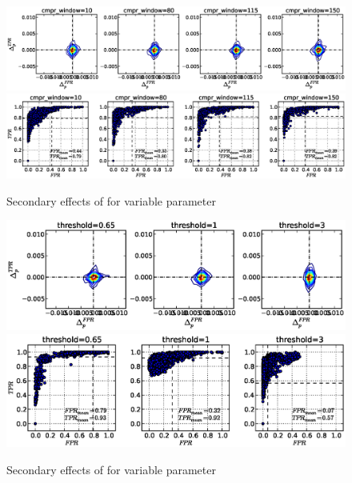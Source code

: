 \begin{figure}[!h]
\begin{center}
\includegraphics[width=6in]{../fig/final/delta_hist_sec/w_smooth/cmpr_window}
\includegraphics[width=5.5in]{../fig/final/position/all_allowed/w_smooth/cmpr_window}
\end{center}
\caption{\label{fig:delta_sec6} Secondary effects of  for
  variable parameter }
\end{figure}

\begin{figure}[!h]
\begin{center}
\includegraphics[width=6in]{../fig/final/delta_hist_sec/w_smooth/threshold}
\includegraphics[width=5.5in]{../fig/final/position/all_allowed/w_smooth/threshold}
\end{center}
\caption{\label{fig:delta_sec6} Secondary effects of  for
  variable parameter }
\end{figure}

